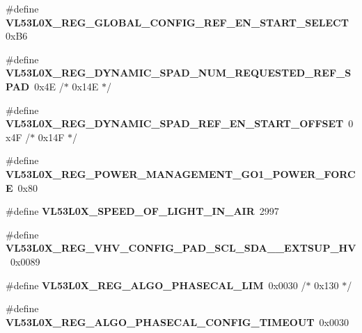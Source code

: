 \begin{DoxyCompactItemize}
\item 
\mbox{\label{group__VL53L0X__DefineRegisters__group_gaef9c69996d0c48a9961bb2ec0a7903ab}} 
\#define {\bfseries V\+L53\+L0\+X\+\_\+\+R\+E\+G\+\_\+\+G\+L\+O\+B\+A\+L\+\_\+\+C\+O\+N\+F\+I\+G\+\_\+\+R\+E\+F\+\_\+\+E\+N\+\_\+\+S\+T\+A\+R\+T\+\_\+\+S\+E\+L\+E\+CT}~0x\+B6
\item 
\mbox{\label{group__VL53L0X__DefineRegisters__group_gafb36ecb857354ef3c15bfc5ee5991808}} 
\#define {\bfseries V\+L53\+L0\+X\+\_\+\+R\+E\+G\+\_\+\+D\+Y\+N\+A\+M\+I\+C\+\_\+\+S\+P\+A\+D\+\_\+\+N\+U\+M\+\_\+\+R\+E\+Q\+U\+E\+S\+T\+E\+D\+\_\+\+R\+E\+F\+\_\+\+S\+P\+AD}~0x4\+E /$\ast$ 0x14\+E $\ast$/
\item 
\mbox{\label{group__VL53L0X__DefineRegisters__group_ga1a80758b8d79b09bf96def75f099e5c5}} 
\#define {\bfseries V\+L53\+L0\+X\+\_\+\+R\+E\+G\+\_\+\+D\+Y\+N\+A\+M\+I\+C\+\_\+\+S\+P\+A\+D\+\_\+\+R\+E\+F\+\_\+\+E\+N\+\_\+\+S\+T\+A\+R\+T\+\_\+\+O\+F\+F\+S\+ET}~0x4\+F /$\ast$ 0x14\+F $\ast$/
\item 
\mbox{\label{group__VL53L0X__DefineRegisters__group_ga4e810c9a881bf60e6ff927da4177e203}} 
\#define {\bfseries V\+L53\+L0\+X\+\_\+\+R\+E\+G\+\_\+\+P\+O\+W\+E\+R\+\_\+\+M\+A\+N\+A\+G\+E\+M\+E\+N\+T\+\_\+\+G\+O1\+\_\+\+P\+O\+W\+E\+R\+\_\+\+F\+O\+R\+CE}~0x80
\item 
\mbox{\label{group__VL53L0X__DefineRegisters__group_ga5ec7935c0d2aa3d3db3c5c817016eb4f}} 
\#define {\bfseries V\+L53\+L0\+X\+\_\+\+S\+P\+E\+E\+D\+\_\+\+O\+F\+\_\+\+L\+I\+G\+H\+T\+\_\+\+I\+N\+\_\+\+A\+IR}~2997
\item 
\mbox{\label{group__VL53L0X__DefineRegisters__group_gae1e376db977da1219f864343cee6cf35}} 
\#define {\bfseries V\+L53\+L0\+X\+\_\+\+R\+E\+G\+\_\+\+V\+H\+V\+\_\+\+C\+O\+N\+F\+I\+G\+\_\+\+P\+A\+D\+\_\+\+S\+C\+L\+\_\+\+S\+D\+A\+\_\+\+\_\+\+E\+X\+T\+S\+U\+P\+\_\+\+HV}~0x0089
\item 
\mbox{\label{group__VL53L0X__DefineRegisters__group_gacc03823fda932f94b3b32649bd56d373}} 
\#define {\bfseries V\+L53\+L0\+X\+\_\+\+R\+E\+G\+\_\+\+A\+L\+G\+O\+\_\+\+P\+H\+A\+S\+E\+C\+A\+L\+\_\+\+L\+IM}~0x0030 /$\ast$ 0x130 $\ast$/
\item 
\mbox{\label{group__VL53L0X__DefineRegisters__group_ga475b02140a49c98f6bf332ec13dfc512}} 
\#define {\bfseries V\+L53\+L0\+X\+\_\+\+R\+E\+G\+\_\+\+A\+L\+G\+O\+\_\+\+P\+H\+A\+S\+E\+C\+A\+L\+\_\+\+C\+O\+N\+F\+I\+G\+\_\+\+T\+I\+M\+E\+O\+UT}~0x0030
\end{DoxyCompactItemize}


